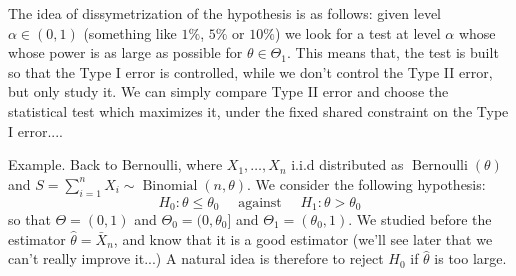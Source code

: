 \documentclass[
	fontsize=11pt, %
	twoside=false, %
	numbers=noenddot, %
]{kaobook}
\DeclareMathOperator{\ber}{Bernoulli}
\DeclareMathOperator{\bin}{Binomial}
\newcommand{\wh}{\widehat}
\begin{document}
The idea of dissymetrization of the hypothesis is as follows: given level $\alpha \in (0, 1)$ (something like $1\%$, $5\%$ or $10\%$) we look for a test at level $\alpha$ whose whose power is as large as possible for $\theta \in \Theta_1$.
This means that, the test is built so that the Type I error is controlled, while we don't control the Type II error, but only study it.
We can simply compare Type II error and choose the statistical test which maximizes it, under the fixed shared constraint on the Type I error....

Example. Back to Bernoulli, where $X_1, \ldots, X_n$ i.i.d distributed as $\ber(\theta)$ and $S = \sum_{i=1}^n X_i \sim \bin(n, \theta)$.
We consider the following hypothesis:
\begin{equation*}
	H_0 : \theta \leq \theta_0 \quad \text{ against } \quad H_1 : \theta > \theta_0
\end{equation*}
so that $\Theta = (0, 1)$ and $\Theta_0 = (0, \theta_0]$ and $\Theta_1 = (\theta_0, 1)$.
We studied before the estimator $\wh \theta = \bar X_n$, and know that it is a good estimator (we'll see later that we can't really improve it...)
A natural idea is therefore to reject $H_0$ if $\wh \theta$ is too large.
\end{document}
